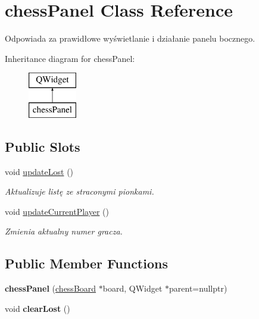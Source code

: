 \hypertarget{classchess_panel}{}\section{chess\+Panel Class Reference}
\label{classchess_panel}


Odpowiada za prawidłowe wyświetlanie i działanie panelu bocznego.  


Inheritance diagram for chess\+Panel\+:\begin{figure}[H]
\begin{center}
\leavevmode
\includegraphics[height=2.000000cm]{classchess_panel}
\end{center}
\end{figure}
\subsection*{Public Slots}
\begin{DoxyCompactItemize}
\item 
\mbox{\label{classchess_panel_adeab3d504a94b4380487c3a04a10441e}} 
void \hyperlink{classchess_panel_adeab3d504a94b4380487c3a04a10441e}{update\+Lost} ()
\begin{DoxyCompactList}\small\item\em Aktualizuje listę ze straconymi pionkami. \end{DoxyCompactList}\item 
\mbox{\label{classchess_panel_a65f79990c4a6fdd8b26c469d605d44e8}} 
void \hyperlink{classchess_panel_a65f79990c4a6fdd8b26c469d605d44e8}{update\+Current\+Player} ()
\begin{DoxyCompactList}\small\item\em Zmienia aktualny numer gracza. \end{DoxyCompactList}\end{DoxyCompactItemize}
\subsection*{Public Member Functions}
\begin{DoxyCompactItemize}
\item 
\mbox{\label{classchess_panel_aaba2c97d187804e244977d982c71a79f}} 
{\bfseries chess\+Panel} (\hyperlink{classchess_board}{chess\+Board} $\ast$board, Q\+Widget $\ast$parent=nullptr)
\item 
\mbox{\label{classchess_panel_a5fb61b2212fc50934fb84865774a1708}} 
void {\bfseries clear\+Lost} ()
\end{DoxyCompactItemize}


